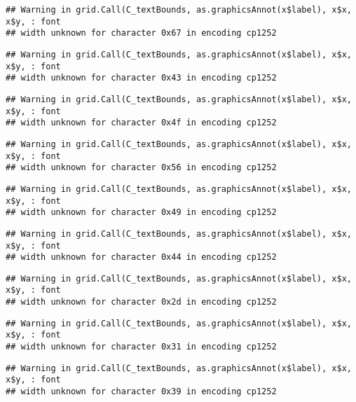 \documentclass[
]{article}
\begin{document}
\begin{verbatim}
## Warning in grid.Call(C_textBounds, as.graphicsAnnot(x$label), x$x, x$y, : font
## width unknown for character 0x67 in encoding cp1252
\end{verbatim}

\begin{verbatim}
## Warning in grid.Call(C_textBounds, as.graphicsAnnot(x$label), x$x, x$y, : font
## width unknown for character 0x43 in encoding cp1252
\end{verbatim}

\begin{verbatim}
## Warning in grid.Call(C_textBounds, as.graphicsAnnot(x$label), x$x, x$y, : font
## width unknown for character 0x4f in encoding cp1252
\end{verbatim}

\begin{verbatim}
## Warning in grid.Call(C_textBounds, as.graphicsAnnot(x$label), x$x, x$y, : font
## width unknown for character 0x56 in encoding cp1252
\end{verbatim}

\begin{verbatim}
## Warning in grid.Call(C_textBounds, as.graphicsAnnot(x$label), x$x, x$y, : font
## width unknown for character 0x49 in encoding cp1252
\end{verbatim}

\begin{verbatim}
## Warning in grid.Call(C_textBounds, as.graphicsAnnot(x$label), x$x, x$y, : font
## width unknown for character 0x44 in encoding cp1252
\end{verbatim}

\begin{verbatim}
## Warning in grid.Call(C_textBounds, as.graphicsAnnot(x$label), x$x, x$y, : font
## width unknown for character 0x2d in encoding cp1252
\end{verbatim}

\begin{verbatim}
## Warning in grid.Call(C_textBounds, as.graphicsAnnot(x$label), x$x, x$y, : font
## width unknown for character 0x31 in encoding cp1252
\end{verbatim}

\begin{verbatim}
## Warning in grid.Call(C_textBounds, as.graphicsAnnot(x$label), x$x, x$y, : font
## width unknown for character 0x39 in encoding cp1252
\end{verbatim}
\end{document}
